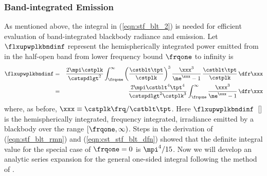 \documentclass[12pt]{article}
\begin{document}
\subsubsection[Band-integrated Emission]{Band-integrated Emission}\label{sxn:msn}
As mentioned above, the integral in (\ref{eqn:stf_blt_2}) is needed
for efficient evaluation of band-integrated blackbody radiance and
emission.
Let $\flxupwplkbndinf$ represent the hemispherically integrated power
emitted from in the half-open band from lower frequency bound
$\frqone$ to infinity is 
\begin{eqnarray}
\flxupwplkbndinf
& = & \frac{2 \mpi \cstplk}{\cstspdlgt^{2}} 
\int_{\frqone}^{\infty} 
\left( \frac{\cstblt \tpt}{\cstplk} \right)^{3}
\frac{\xxx^{3}}{\me^{\xxx} - 1} \, \frac{\cstblt \tpt}{\cstplk} \,\dfr\xxx
\nonumber \\
& = & \frac{2 \mpi \cstblt^{4} \tpt^{4} }{\cstspdlgt^{2} \cstplk^{3}} 
\int_{\frqone}^{\infty} 
\frac{\xxx^{3}}{\me^{\xxx} - 1} \,\dfr\xxx
\label{eqn:plk_ntg_frq}
\end{eqnarray}
where, as before, $\xxx \equiv \cstplk \frq/\cstblt \tpt$.
Here $\flxupwplkbndinf$~[\wxmS] is the hemispherically integrated,
frequency integrated, irradiance emitted by a blackbody over the range 
$[\frqone,\infty)$.
Steps in the derivation of (\ref{eqn:stf_blt_rmn}) and (\ref{eqn:cst_stf_blt_dfn}) showed that the definite integral value for the special case of $\frqone=0$ is $\mpi^{4}/15$.
Now we will develop an analytic series expansion for the general one-sided
integral following the method of \cite{WiW76}.
\end{document}
